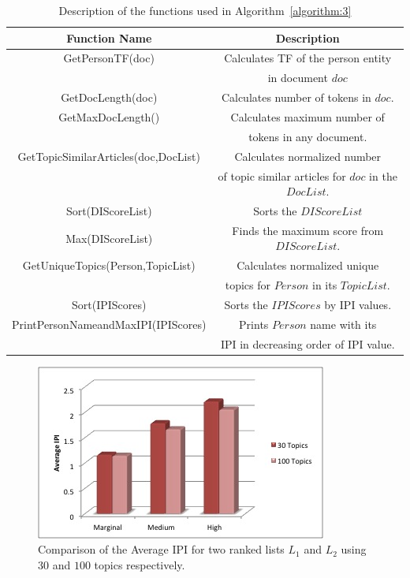\documentclass[10pt,journal,compsoc]{IEEEtran}
\begin{document}
\begin{table}
\begin{center}
\begin{tabular}{|c|c|} \hline
Function Name & Description \\ \hline
GetPersonTF(doc) & Calculates TF of the person entity \\
 & in document $doc$ \\ \hline
GetDocLength(doc) & Calculates number of tokens in $doc$. \\ \hline
GetMaxDocLength() & Calculates maximum number of \\
& tokens in any document.\\ \hline
GetTopicSimilarArticles(doc,DocList) &  Calculates normalized number \\
& of topic similar articles for $doc$ in the $DocList$. \\ \hline
Sort(DIScoreList) & Sorts the $DIScoreList$ \\ \hline
Max(DIScoreList) & Finds the maximum score from $DIScoreList$. \\ \hline
GetUniqueTopics(Person,TopicList) & Calculates normalized unique \\
& topics for $Person$ in its $TopicList$. \\ \hline
Sort(IPIScores) & Sorts the $IPIScores$ by IPI values. \\ \hline
PrintPersonNameandMaxIPI(IPIScores) & Prints $Person$ name with its \\
& IPI in decreasing order of IPI value. \\ \hline
\end{tabular}
\end{center}
\caption{Description of the functions used in Algorithm~\ref{algorithm:3}}
\label{default}
\end{table}%

\begin{figure}
\begin{center}
\includegraphics[scale=0.75]{IPIChart}
\end{center}
\caption{Comparison of the Average IPI for two ranked lists $L_1$ and $L_2$ using $30$ and $100$ topics respectively.}
\label{figure:IPI}
\end{figure}
\end{document}
